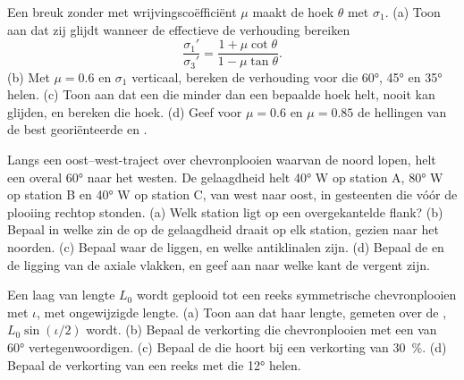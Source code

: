 \begin{exercise}[$\star\star\star$]\label{exo:b1:faults-folds-fabrics:10}
Een breuk zonder  met wrijvingscoëfficiënt $\mu$ maakt de hoek $\theta$ met $\sigma_1$. (a) Toon aan dat zij glijdt wanneer de effectieve  de verhouding bereiken
\[
  \frac{\sigma_1'}{\sigma_3'} = \frac{1 + \mu\cot\theta}{1 - \mu\tan\theta} .
\]
(b) Met $\mu = 0.6$ en $\sigma_1$ verticaal, bereken de verhouding voor  die \ang{60}, \ang{45} en \ang{35} helen. (c) Toon aan dat een  die minder dan een bepaalde hoek helt, nooit kan glijden, en bereken die hoek. (d) Geef voor $\mu = 0.6$ en $\mu = 0.85$ de hellingen van de best georiënteerde  en .
\end{exercise}

\begin{exercise}[$\star\star\star$]\label{exo:b1:faults-folds-fabrics:11}
Langs een oost--west-traject over chevronplooien waarvan de  noord lopen, helt een  overal \ang{60} naar het westen. De gelaagdheid helt \ang{40} W op station A, \ang{80} W op station B en \ang{40} W op station C, van west naar oost, in gesteenten die vóór de plooiing rechtop stonden. (a) Welk station ligt op een overgekantelde flank? (b) Bepaal in welke zin de  op de gelaagdheid draait op elk station, gezien naar het noorden. (c) Bepaal waar de  liggen, en welke antiklinalen zijn. (d) Bepaal de  en de ligging van de axiale vlakken, en geef aan naar welke kant de  vergent zijn.
\end{exercise}

\begin{exercise}[$\star\star\star$]\label{exo:b1:faults-folds-fabrics:12}
Een laag van lengte $L_0$ wordt geplooid tot een reeks symmetrische chevronplooien met  $\iota$, met ongewijzigde lengte. (a) Toon aan dat haar lengte, gemeten over de , $L_0\sin(\iota/2)$ wordt. (b) Bepaal de verkorting die chevronplooien met een  van \ang{60} vertegenwoordigen. (c) Bepaal de  die hoort bij een verkorting van \qty{30}{\percent}. (d) Bepaal de verkorting van een reeks  met  die \ang{12} helen.
\end{exercise}

